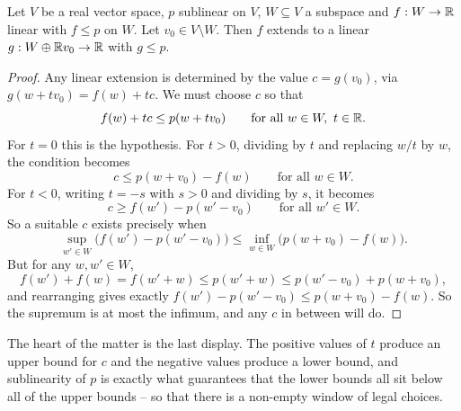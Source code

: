 \documentclass[a4paper]{scrartcl}
\begin{document}
\begin{lemma}
	Let $V$ be a real vector space, $p$ sublinear on $V$, $W \subseteq V$ a subspace and $f : W \to \mathbb{R}$ linear with $f \leq p$ on $W$. Let $v_0 \in V \setminus W$. Then $f$ extends to a linear $g : W \oplus \mathbb{R} v_0 \to \mathbb{R}$ with $g \leq p$.
\end{lemma}

\begin{proof}
	Any linear extension is determined by the value $c = g(v_0)$, via $g(w + t v_0) = f(w) + tc$. We must choose $c$ so that
	$$f(w) + tc \leq p(w + t v_0) \qquad \text{for all } w \in W, \ t \in \mathbb{R}.$$
	For $t = 0$ this is the hypothesis. For $t > 0$, dividing by $t$ and replacing $w/t$ by $w$, the condition becomes
	$$c \leq p(w + v_0) - f(w) \qquad \text{for all } w \in W.$$
	For $t < 0$, writing $t = -s$ with $s>0$ and dividing by $s$, it becomes
	$$c \geq f(w') - p(w' - v_0) \qquad \text{for all } w' \in W.$$
	So a suitable $c$ exists precisely when
	$$\sup_{w' \in W} \big( f(w') - p(w' - v_0) \big) \leq \inf_{w \in W} \big( p(w + v_0) - f(w) \big).$$
	But for any $w, w' \in W$,
	$$f(w') + f(w) = f(w' + w) \leq p(w' + w) \leq p(w' - v_0) + p(w + v_0),$$
	and rearranging gives exactly $f(w') - p(w' - v_0) \leq p(w + v_0) - f(w)$. So the supremum is at most the infimum, and any $c$ in between will do.
\end{proof}

The heart of the matter is the last display. The positive values of $t$ produce an upper bound for $c$ and the negative values produce a lower bound, and sublinearity of $p$ is exactly what guarantees that the lower bounds all sit below all of the upper bounds -- so that there is a non-empty window of legal choices.

\begin{center}
\end{center}
\end{document}
